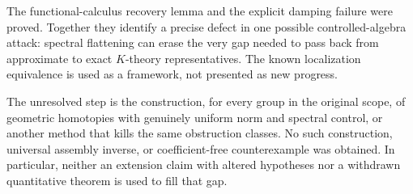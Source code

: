 \documentclass[11pt]{article}
\begin{document}
The functional-calculus recovery lemma and the explicit damping failure
were proved. Together they identify a precise defect in one possible
controlled-algebra attack: spectral flattening can erase the very gap
needed to pass back from approximate to exact $K$-theory representatives.
The known localization equivalence is used as a framework, not presented
as new progress.

The unresolved step is the construction, for every group in the original
scope, of geometric homotopies with genuinely uniform norm and spectral
control, or another method that kills the same obstruction classes.
No such construction, universal assembly inverse, or coefficient-free
counterexample was obtained. In particular, neither an extension claim
with altered hypotheses nor a withdrawn quantitative theorem is used to
fill that gap.
\end{document}
